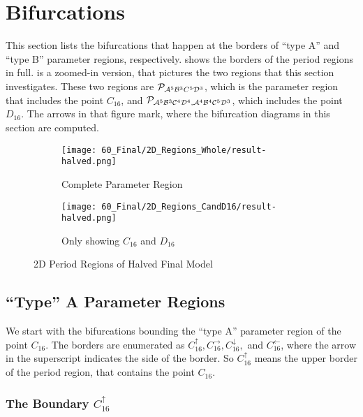 \section{Bifurcations}

This section lists the bifurcations that happen at the borders of ``type A'' and ``type B'' parameter regions, respectively.
 shows the borders of the period regions in full.
 is a zoomed-in version, that pictures the two regions that this section investigates.
These two regions are $\mathcal{P}_{\mathcal{A}^5\mathcal{B}^3C^5\mathcal{D}^3}$, which is the parameter region that includes the point $C_{16}$, and $\mathcal{P}_{\mathcal{A}^5\mathcal{B}^3\mathcal{C}^4\mathcal{D}^4, \mathcal{A}^4\mathcal{B}^4\mathcal{C}^5\mathcal{D}^3}$, which includes the point $D_{16}$.
The arrows in that figure mark, where the bifurcation diagrams in this section are computed.

\begin{figure}
    \centering
    \begin{subfigure}{0.4\textwidth}
        \centering
        \texttt{[image: 60\_Final/2D\_Regions\_Whole/result-halved.png]}
        \caption{Complete Parameter Region}
        \label{fig:final.regions.whole.halved}
    \end{subfigure}
    \begin{subfigure}{0.4\textwidth}
        \centering
        \texttt{[image: 60\_Final/2D\_Regions\_CandD16/result-halved.png]}
        \caption{Only showing $C_{16}$ and $D_{16}$}
        \label{fig:final.regions.CandD16.halved}
    \end{subfigure}
    \caption{2D Period Regions of Halved Final Model}
\end{figure}

\subsection{``Type'' A Parameter Regions}

We start with the bifurcations bounding the ``type A'' parameter region of the point $C_{16}$.
The borders are enumerated as $C_{16}^\uparrow, C_{16}^\rightarrow, C_{16}^\downarrow,$ and $C_{16}^\leftarrow$, where the arrow in the superscript indicates the side of the border.
So $C_{16}^\uparrow$ means the upper border of the period region, that contains the point $C_{16}$.

\subsubsection{The Boundary $C_{16}^\uparrow$}

